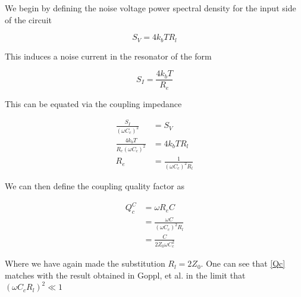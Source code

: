 \documentclass[12pt,reqno]{amsart}
\begin{document}
We begin by defining the noise voltage power spectral density for the input side of the circuit

\begin{equation}
S_V = 4k_bT R_l
\label{CcoupSv}
\end{equation}

This induces a noise current in the resonator of the form

\begin{equation}
S_I = \frac{4k_bT}{R_e}
\label{CcoupSI}
\end{equation}

This can be equated via the coupling impedance

\begin{align}
\frac{S_I}{(\omega C_c)^2} &= S_V \\
\frac{4k_bT}{R_e(\omega C_c)^2} &= 4k_bTR_l \\
R_e &= \frac{1}{(\omega C_c)^2R_l}
\end{align}

We can then define the coupling quality factor as

\begin{align}
Q_c^C  &= \omega R_e C \\ 
&= \frac{\omega C}{(\omega C_c)^2 R_l} \\ 
&= \frac{C}{2Z_0 \omega C_c^2} \label{Qc}
\end{align}

Where we have again made the substitution $R_l = 2Z_0$. One can see that \eqref{Qc} matches with the result obtained in Goppl, et al. in the limit that $(\omega C_c R_l)^2 \ll 1$
\end{document}
